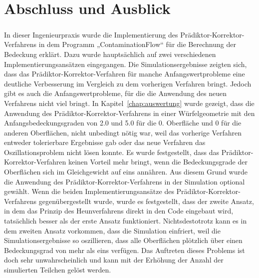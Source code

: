 \documentclass{listhesis}
\begin{document}

\chapter{Abschluss und Ausblick} \label{chap:abschluss}
\paragraph{}
In dieser Ingenieurpraxis wurde die Implementierung des Prädiktor-Korrektor-Verfahrens in dem Programm „ContaminationFlow“ für die Berechnung der Bedeckung erklärt. Dazu wurde hauptsächlich auf zwei verschiedenen Implementierungsansätzen eingegangen. Die Simulationsergebnisse zeigten sich, dass das Prädiktor-Korrektor-Verfahren für manche Anfangswertprobleme eine deutliche Verbesserung im Vergleich zu dem vorherigen Verfahren bringt. Jedoch gibt es auch die Anfangswertprobleme, für die die Anwendung des neuen Verfahrens nicht viel bringt. In Kapitel~\ref{chap:auswertung} wurde gezeigt, dass die Anwendung des Prädiktor-Korrektor-Verfahrens in einer Würfelgeometrie mit den Anfangsbedeckungsgraden von 2.0 und 5.0 für die  0. Oberfläche und 0 für die anderen Oberflächen, nicht unbedingt nötig war, weil das vorherige Verfahren entweder tolerierbare Ergebnisse gab oder das neue Verfahren das Oszillationsproblem nicht lösen konnte. Es wurde festgestellt, dass das Prädiktor-Korrektor-Verfahren keinen Vorteil mehr bringt, wenn die Bedeckungsgrade der Oberflächen sich im Gleichgewicht auf eins annähren. Aus diesem Grund wurde die Anwendung des Prädiktor-Korrektor-Verfahrens in der Simulation optional gewählt. Wenn die beiden Implementierungsansätze des Prädiktor-Korrektor-Verfahrens gegenübergestellt wurde, wurde es festgestellt, dass der zweite Ansatz, in dem das Prinzip des Heunverfahrens direkt in den Code eingebaut wird, tatsächlich besser als der erste Ansatz funktioniert. Nichtsdestotrotz kann es in dem zweiten Ansatz vorkommen, dass die Simulation einfriert, weil die Simulationsergebnisse so oszillieren, dass alle Oberflächen plötzlich über einen Bedeckungsgrad von mehr als eins verfügen. Das Auftreten dieses Problems ist doch sehr unwahrscheinlich und kann mit der Erhöhung der Anzahl der simulierten Teilchen gelöst werden.
\end{document}
